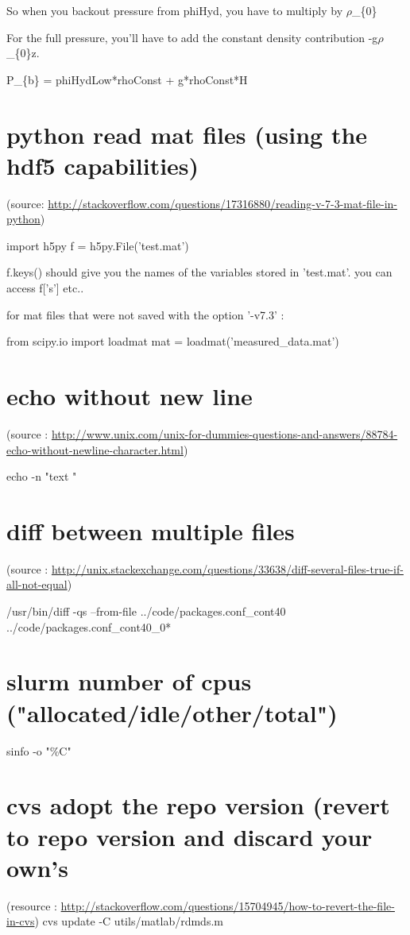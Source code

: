 \documentclass[11pt]{article}
\begin{document}
So when you backout pressure from phiHyd, you have to multiply by $\rho$\_\{0\}

For the full pressure, you'll have to add 
the constant density contribution -g$\rho$\_\{0\}z.

P\_\{b\} = phiHydLow*rhoConst + g*rhoConst*H

\section{python read mat files (using the hdf5 capabilities)}
\label{sec-62}

(source: \url{http://stackoverflow.com/questions/17316880/reading-v-7-3-mat-file-in-python})

import h5py
f = h5py.File('test.mat')

f.keys() should give you the names of the variables stored in 'test.mat'.
you can access f['s']\footnotemark[1]{} etc.. 

for mat files that were not saved with the option '-v7.3' :

from scipy.io import loadmat
mat = loadmat('measured\_data.mat') 

\section{echo without new line}
\label{sec-63}
(source : \url{http://www.unix.com/unix-for-dummies-questions-and-answers/88784-echo-without-newline-character.html})

echo -n "text "
\section{diff between multiple files}
\label{sec-64}
(source : \url{http://unix.stackexchange.com/questions/33638/diff-several-files-true-if-all-not-equal})

/usr/bin/diff -qs --from-file ../code/packages.conf\_cont40 ../code/packages.conf\_cont40\_0*
\section{slurm number of cpus ("allocated/idle/other/total")}
\label{sec-65}

sinfo -o "\%C"
\section{cvs adopt the repo version (revert to repo version and discard your own's}
\label{sec-66}
(resource : \url{http://stackoverflow.com/questions/15704945/how-to-revert-the-file-in-cvs})
cvs update -C utils/matlab/rdmds.m
\end{document}
